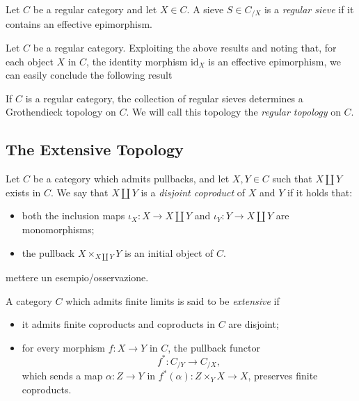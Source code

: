 \begin{defi}
	Let $C$ be a regular category and let $X\in C$. A sieve $S\in C_{/X}$ is a \textit{regular sieve} if it contains an effective epimorphism.
\end{defi}
Let $C$ be a regular category. Exploiting the above results and noting that, for each object $X$ in $C$, the identity morphism $\mbox{id}_X$ is an effective epimorphism, we can easily conclude the following result
\begin{lem}
	If $C$ is a regular category, the collection of regular sieves determines a Grothendieck topology on $C$. We will call this topology the \textit{regular topology} on $C$.
\end{lem} 


\subsection{The Extensive Topology}
\begin{defi}
	Let $C$ be a category which admits pullbacks, and let $X,Y\in C$ such that $X\amalg Y$ exists in $C$. We say that $X\amalg Y$ is a \textit{disjoint coproduct} of $X$ and $Y$ if it holds that:
	\begin{itemize}[nosep]
		\item[(a)] both the inclusion maps $\iota_X:X\to X\amalg Y$ and $\iota_Y:Y\to X\amalg Y$ are monomorphisms;   
		\item[(b)] the pullback $X\times_{X\amalg Y}Y$ is an initial object of $C$.
	\end{itemize}
\end{defi}
\begin{ex}
	mettere un esempio/osservazione.
\end{ex}
\begin{defi}
	A category $C$ which admits finite limits is said to be \textit{extensive} if 
	\begin{itemize}[nosep]
		\item[(a)] it admits finite coproducts and coproducts in $C$ are disjoint;
		\item[(b)] for every morphism $f:X\to Y$ in $C$, the pullback functor
		\begin{equation*}
			f^*:C_{/Y}\to C_{/X},
		\end{equation*} 
		which sends a map $\alpha:Z\to Y$ in $f^*(\alpha):Z\times_Y X\to X$, preserves finite coproducts.
	\end{itemize}
\end{defi}

